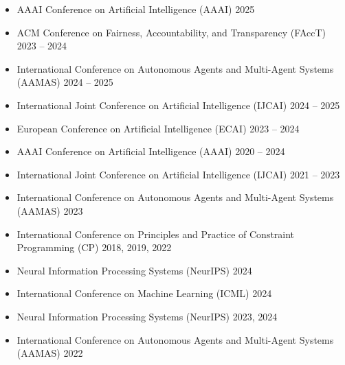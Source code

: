 

\begin{itemize}
  \item AAAI Conference on Artificial Intelligence (AAAI) \hfill {2025}  
  \item ACM Conference on Fairness, Accountability, and Transparency (FAccT) \hfill {2023 -- 2024}
  \item International Conference on Autonomous Agents and Multi-Agent Systems (AAMAS) \hfill {2024 -- 2025}
  \item International Joint Conference on Artificial Intelligence (IJCAI) \hfill {2024 -- 2025}
  \item European Conference on Artificial Intelligence (ECAI) \hfill {2023 -- 2024}
\end{itemize}

\begin{itemize}
  \item AAAI Conference on Artificial Intelligence (AAAI) \hfill {2020 -- 2024}
  \item International Joint Conference on Artificial Intelligence (IJCAI) \hfill {2021 -- 2023}
  \item International Conference on Autonomous Agents and Multi-Agent Systems (AAMAS) \hfill {2023}
  \item International Conference on Principles and Practice of Constraint Programming (CP) \hfill{2018, 2019, 2022} 
  \item Neural Information Processing Systems (NeurIPS)  \hfill {2024}
\end{itemize}

\begin{itemize}
  \item International Conference on Machine Learning (ICML) \hfill 2024

  \item Neural Information Processing Systems (NeurIPS)  \hfill {2023, 2024}

  \item International Conference on Autonomous Agents and Multi-Agent Systems (AAMAS) \hfill {2022}
\end{itemize}


